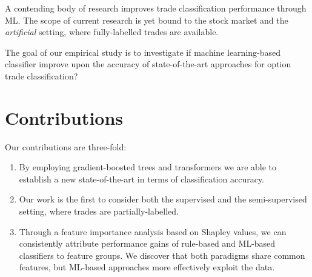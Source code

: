A contending body of research \autocites{blazejewskiLocalNonParametricModel2005}{rosenthalModelingTradeDirection2012}{ronenMachineLearningTrade2022} improves trade classification performance through \gls{ML}. The scope of current research is yet bound to the stock market and the \textit{artificial} setting, where fully-labelled trades are available. 

The goal of our empirical study is to investigate if machine learning-based classifier improve upon the accuracy of state-of-the-art approaches for option trade classification?

\section{Contributions}


Our contributions are three-fold: 
\begin{enumerate}[label=(\roman*),noitemsep]
\item By employing gradient-boosted trees and transformers we are able to establish a new state-of-the-art in terms of classification accuracy. 
\item Our work is the first to consider both the supervised and the semi-supervised setting, where trades are partially-labelled.
\item Through a feature importance analysis based on Shapley values, we can consistently attribute performance gains of rule-based and \gls{ML}-based classifiers to feature groups. We discover that both paradigms share common features, but \gls{ML}-based approaches more effectively exploit the data. %
\end{enumerate}










